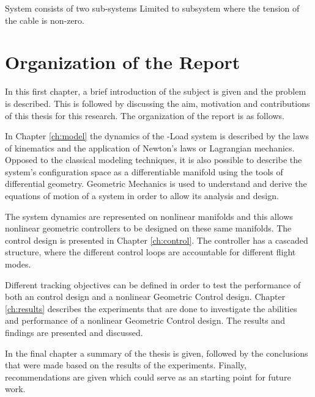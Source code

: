 System consists of two sub-systems
Limited to subsystem where the tension of the cable is non-zero. 

\section{Organization of the Report}

In this first chapter, a brief introduction of the subject is given and the problem is described. This is followed by discussing the aim, motivation and contributions of this thesis for this research. The organization of the report is as follows.

In Chapter \ref{ch:model} the dynamics of the -Load system is described by the laws of kinematics and the application of Newton's laws or Lagrangian mechanics. Opposed to the classical modeling techniques, it is also possible to describe the system's configuration space as a differentiable manifold using the tools of differential geometry. Geometric Mechanics is used to understand and derive the equations of motion of a system in order to allow its analysis and design. 

The system dynamics are represented on nonlinear manifolds and this allows nonlinear geometric controllers to be designed on these same manifolds. The control design is presented in Chapter \ref{ch:control}. The controller has a cascaded structure, where the different control loops are accountable for different flight modes. 

Different tracking objectives can be defined in order to test the performance of both an  control design and a nonlinear Geometric Control design. 
Chapter \ref{ch:results} describes the experiments that are done to investigate the abilities and performance of a nonlinear Geometric Control design. 
The results and findings are presented and discussed.

In the final chapter a summary of the thesis is given, followed by the conclusions that were made based on the results of the experiments.
Finally, recommendations are given which could serve as an starting point for future work. 

